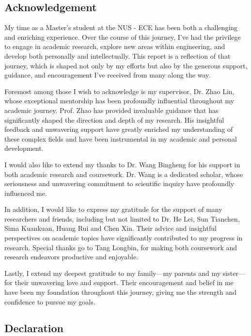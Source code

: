 \documentclass[12pt,twoside,letterpaper]{article}
\begin{document}
\newpage

\begin{center}
    \section*{Acknowledgement}
\end{center}
My time as a Master’s student at the NUS - ECE has been both a challenging and enriching experience. Over the course of this journey, I’ve had the privilege to engage in academic research, explore new areas within engineering, and develop both personally and intellectually. This report is a reflection of that journey, which is shaped not only by my efforts but also by the generous support, guidance, and encouragement I’ve received from many along the way.

Foremost among those I wish to acknowledge is my supervisor, Dr. Zhao Lin, whose exceptional mentorship has been profoundly influential throughout my academic journey. Prof. Zhao has provided invaluable guidance that has significantly shaped the direction and depth of my research. His insightful feedback and unwavering support have greatly enriched my understanding of these complex fields and have been instrumental in my academic and personal development.  

I would also like to extend my thanks to Dr. Wang Bingheng for his support in both academic research and coursework. Dr. Wang is a dedicated scholar, whose seriousness and unwavering commitment to scientific inquiry have profoundly influenced me. 

In addition, I would like to express my gratitude for the support of many researchers and friends, including but not limited to Dr. He Lei, Sun Tianchen, Sima Kuankuan, Huang Rui and Chen Xin. Their advice and insightful perspectives on academic topics have significantly contributed to my progress in research. Special thanks go to Tang Longbin, for making both coursework and research endeavors productive and enjoyable.

Lastly, I extend my deepest gratitude to my family—my parents and my sister—for their unwavering love and support. Their encouragement and belief in me have been my foundation throughout this journey, giving me the strength and confidence to pursue my goals.

\newpage


\begin{center}
    \section*{Declaration}
\end{center}
\end{document}
